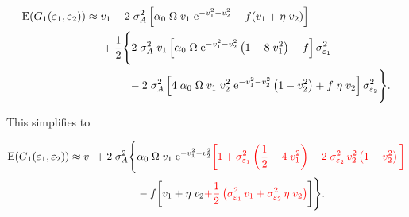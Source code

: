 \begin{equation*}
\begin{split}
    \text{E}(G_1(\varepsilon_{1}, \varepsilon_{2})) \approx \; &
        v_1 + 2 \; \sigma_A^2 \left[ 
            \alpha_0 \; \Omega \; v_1 \; \text{e}^{-v_1^2 - v_2^2} - f (v_1 + \eta \; v_2)
        \right] \\
        &+ \frac{1}{2} \Bigg\{
            2 \; \sigma_A^2 \; v_1 \left[
                \alpha_0 \; \Omega \; \text{e}^{-v_1^2 - v_2^2} \left( 1 - 8 \; v_1^2 \right) - f
            \right] \sigma^2_{\varepsilon_{1}} \\
            & \hspace{2.5em} - 2 \; \sigma_A^2 \left[
                4 \; \alpha_0 \; \Omega \; v_1 \; v_2^2 \; \text{e}^{-v_1^2 - v_2^2} \left( 1 - v_2^2 \right) + f \; \eta \; v_2
            \right] \sigma^2_{\varepsilon_{2}}
        \Bigg\} %
%
%
%
%
\text{.}
\end{split}
\end{equation*}

This simplifies to 

\begin{equation}
\label{eq:taylor-expansion-final-supp}
\begin{split}
    \text{E}(G_1(\varepsilon_{1}, \varepsilon_{2})) \approx
        v_1 + 2 \; \sigma_A^2 \Bigg\{ 
            & \alpha_0 \; \Omega \; v_1 \; \text{e}^{-v_1^2 - v_2^2} 
            \color{red} \bigg[ 
                1 + \sigma^2_{\varepsilon_{1}} \left( \frac{1}{2} - 4 \; v_1^2 \right)
                - 2 \; \sigma^2_{\varepsilon_{2}} \, v_2^2 \left( 1 - v_2^2 \right)
            \bigg] \\
            & - f \bigg[
                v_1 + \eta \; v_2 
                {\color{red} + \frac{1}{2} \left(
                    \sigma^2_{\varepsilon_{1}} \, v_1 + \sigma^2_{\varepsilon_{2}} \, \eta \; v_2
                \right)}
            \bigg]
        \Bigg\}
\text{.}
\end{split}
\end{equation}


